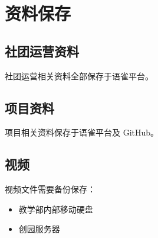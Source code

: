 \section{资料保存}
    \subsection{社团运营资料}
    社团运营相关资料全部保存于语雀平台。


    \subsection{项目资料}
    项目相关资料保存于语雀平台及 GitHub。


    \subsection{视频}
    视频文件需要备份保存：
    \begin{itemize}
        \item 教学部内部移动硬盘
        \item 创园服务器
    \end{itemize}
